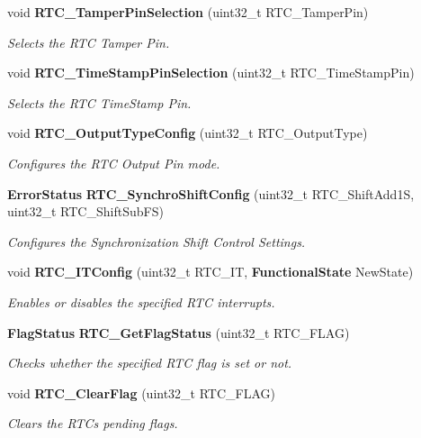 \begin{DoxyCompactItemize}
void \textbf{ R\+T\+C\+\_\+\+Tamper\+Pin\+Selection} (uint32\+\_\+t R\+T\+C\+\_\+\+Tamper\+Pin)
\begin{DoxyCompactList}\small\item\em Selects the R\+TC Tamper Pin. \end{DoxyCompactList}\item 
void \textbf{ R\+T\+C\+\_\+\+Time\+Stamp\+Pin\+Selection} (uint32\+\_\+t R\+T\+C\+\_\+\+Time\+Stamp\+Pin)
\begin{DoxyCompactList}\small\item\em Selects the R\+TC Time\+Stamp Pin. \end{DoxyCompactList}\item 
void \textbf{ R\+T\+C\+\_\+\+Output\+Type\+Config} (uint32\+\_\+t R\+T\+C\+\_\+\+Output\+Type)
\begin{DoxyCompactList}\small\item\em Configures the R\+TC Output Pin mode. \end{DoxyCompactList}\item 
\textbf{ Error\+Status} \textbf{ R\+T\+C\+\_\+\+Synchro\+Shift\+Config} (uint32\+\_\+t R\+T\+C\+\_\+\+Shift\+Add1S, uint32\+\_\+t R\+T\+C\+\_\+\+Shift\+Sub\+FS)
\begin{DoxyCompactList}\small\item\em Configures the Synchronization Shift Control Settings. \end{DoxyCompactList}\item 
void \textbf{ R\+T\+C\+\_\+\+I\+T\+Config} (uint32\+\_\+t R\+T\+C\+\_\+\+IT, \textbf{ Functional\+State} New\+State)
\begin{DoxyCompactList}\small\item\em Enables or disables the specified R\+TC interrupts. \end{DoxyCompactList}\item 
\textbf{ Flag\+Status} \textbf{ R\+T\+C\+\_\+\+Get\+Flag\+Status} (uint32\+\_\+t R\+T\+C\+\_\+\+F\+L\+AG)
\begin{DoxyCompactList}\small\item\em Checks whether the specified R\+TC flag is set or not. \end{DoxyCompactList}\item 
void \textbf{ R\+T\+C\+\_\+\+Clear\+Flag} (uint32\+\_\+t R\+T\+C\+\_\+\+F\+L\+AG)
\begin{DoxyCompactList}\small\item\em Clears the R\+TC\textquotesingle{}s pending flags. \end{DoxyCompactList}\item 

\end{DoxyCompactItemize}
